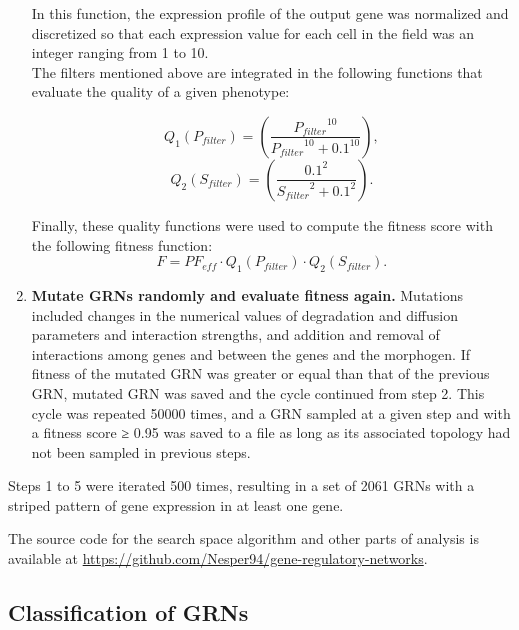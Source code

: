 \documentclass[10pt,letterpaper]{article}
\begin{document}
\begin{enumerate}
 In this function, the expression profile of the output gene was normalized and
 discretized so that each expression value for each cell in the field was an
 integer ranging from 1 to 10.\\

 The filters mentioned above are integrated in the following functions that
 evaluate the quality of a given phenotype:

 \begin{equation}
  Q_1(P_{filter}) = \left( \frac{ {P_{filter}}^{10} }{ {P_{filter}}^{10} +
  0.1^{10} } \right),
 \end{equation}
 \begin{equation}
  Q_2(S_{filter}) = \left( \frac{ 0.1^2 }{ {S_{filter}}^2 + 0.1^2 } \right).
 \end{equation}

 Finally, these quality functions were used to compute the fitness score with
 the following fitness function:
 \begin{equation}
  F = \mathit{PF_{eff}} \cdot Q_1(P_{filter}) \cdot Q_2(S_{filter}).
 \end{equation}

 \item {\bf Mutate GRNs randomly and evaluate fitness again.} Mutations
included changes in the  numerical values of degradation and diffusion
parameters and interaction strengths, and addition and removal of interactions
among genes and between the genes and the morphogen. If fitness of the mutated
GRN was greater or equal than that of the previous GRN, mutated GRN was saved
and the cycle continued from step 2. This cycle was repeated 50000 times, and a GRN
sampled at a given step and with a fitness score ≥ 0.95 was saved to a file as
long as its associated topology had not been sampled in previous steps.

\end{enumerate}

Steps 1 to 5 were iterated 500 times, resulting in a set of 2061 GRNs with a
striped pattern of gene expression in at least one gene.

The source code for the search space algorithm and other parts of analysis is
available at \url{https://github.com/Nesper94/gene-regulatory-networks}.

\subsection*{Classification of GRNs}
\end{document}
